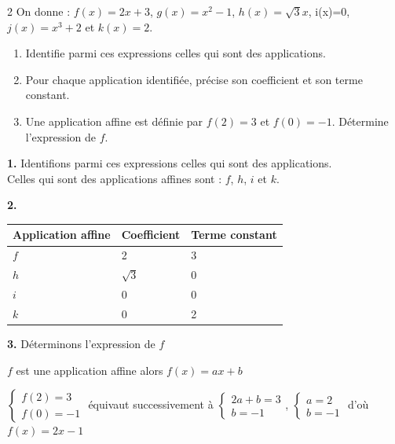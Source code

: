 \begin{multicols*}{2}
 	On donne : $ f(x)=2x+3 $, $ g(x)=x^2-1 $, $ h(x)=\sqrt{3}x $, i(x)=0, $ j(x)=x^3+2 $ et $ k(x)=2 $.
 	\begin{enumerate}
 		\item Identifie parmi ces expressions celles qui sont des applications.
 		\item Pour chaque application identifiée, précise son coefficient et son terme constant.
 		\item Une application affine est définie par $ f(2)=3 $ et $ f(0)=-1 $. Détermine l'expression de $ f $.
 	\end{enumerate}
 	\dure 
 	\resul
 	\textbf{1.} Identifions parmi ces expressions celles qui sont des applications.\\
 	Celles qui sont des applications  affines sont : $f$, $h$, $i$ et  $k$.
 	
 	\textbf{2.}
 	
 	\begin{tabular}{|p{2.3cm}|p{2.3cm}|p{2.3cm}|}
 		\hline
 		Application affine	& Coefficient  & Terme constant \\
 		\hline
 		$f$	&2  &3  \\
 		\hline
 		$h$	&$\sqrt{3}$  &$0$  \\
 		\hline
 		$i$	& 0 &  0\\
 		\hline
 		$k$	&0  &  2\\
 		\hline
 	\end{tabular}
 	
 	\textbf{3.} Déterminons l'expression de $ f $
 	
 	$f$ est une application affine alors $f(x)=ax+b$
 	
 	$\begin{cases}
 		f(2)=3\\ 
 		f(0)=-1
 	\end{cases}$ équivaut successivement à 
 	$\begin{cases}
 		2a+b=3\\ 
 		b=-1
 	\end{cases}$,
 	$\begin{cases}
 		a=2\\ 
 		b=-1
 	\end{cases}$ d'où $f(x)=2x-1$
 	

\end{multicols*}
